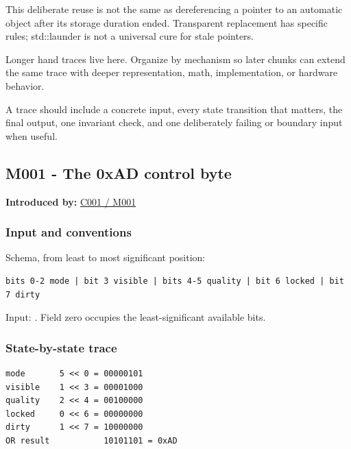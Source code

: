 This deliberate reuse is not the same as dereferencing a pointer to an automatic object after its storage duration ended. Transparent replacement has specific rules; std::launder is not a universal cure for stale pointers.

Longer hand traces live here. Organize by mechanism so later chunks can extend the same trace with deeper representation, math, implementation, or hardware behavior.

A trace should include a concrete input, every state transition that matters, the final output, one invariant check, and one deliberately failing or boundary input when useful.

\subsection{M001 - The 0xAD control byte}\label{appendix-92ff77d4dfdc-m001---the-0xad-control-byte}

\hypertarget{appendix-92ff77d4dfdc-m001---the-0xad-control-byte}{}

\textbf{Introduced by:} \hyperref[01-foundations-i-ch001-from-a-signal-to-an-interpretation]{C001 / M001}

\subsubsection{Input and conventions}\label{appendix-92ff77d4dfdc-input-and-conventions}

\hypertarget{appendix-92ff77d4dfdc-input-and-conventions}{}

Schema, from least to most significant position:

\begin{verbatim}
bits 0-2 mode | bit 3 visible | bits 4-5 quality | bit 6 locked | bit 7 dirty
\end{verbatim}

Input: . Field zero occupies the least-significant available bits.

\subsubsection{State-by-state trace}\label{appendix-92ff77d4dfdc-state-by-state-trace}

\hypertarget{appendix-92ff77d4dfdc-state-by-state-trace}{}

\begin{verbatim}
mode       5 << 0 = 00000101
visible    1 << 3 = 00001000
quality    2 << 4 = 00100000
locked     0 << 6 = 00000000
dirty      1 << 7 = 10000000
OR result           10101101 = 0xAD
\end{verbatim}

